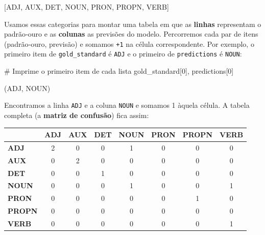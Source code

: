 \documentclass[
  brazilian,
  11pt,
]{article}
\newenvironment{Shaded}{\begin{snugshade}}{\end{snugshade}}
\newcommand{\CommentTok}[1]{\textcolor[rgb]{0.48,0.49,0.49}{#1}}
\newcommand{\DecValTok}[1]{\textcolor[rgb]{0.96,0.45,0.00}{#1}}
\newcommand{\NormalTok}[1]{\textcolor[rgb]{0.81,0.81,0.76}{#1}}
\newcounter{none} %
\let\oldtexttt\texttt
\renewcommand{\texttt}[1]{{\color{inlink}\oldtexttt{#1}}}
\begin{document}
\begin{Shaded}
\begin{Highlighting}[]
\NormalTok{[\textquotesingle{}ADJ\textquotesingle{}, \textquotesingle{}AUX\textquotesingle{}, \textquotesingle{}DET\textquotesingle{}, \textquotesingle{}NOUN\textquotesingle{}, \textquotesingle{}PRON\textquotesingle{}, \textquotesingle{}PROPN\textquotesingle{}, \textquotesingle{}VERB\textquotesingle{}]}
\end{Highlighting}
\end{Shaded}

Usamos essas categorias para montar uma tabela em que as \textbf{linhas}
representam o padrão‑ouro e as \textbf{colunas} as previsões do modelo.
Percorremos cada par de itens (padrão‑ouro, previsão) e somamos
\texttt{+1} na célula correspondente. Por exemplo, o primeiro item de
\texttt{gold\_standard} é \texttt{ADJ} e o primeiro de
\texttt{predictions} é \texttt{NOUN}:

\begin{Shaded}
\begin{Highlighting}[]
\CommentTok{\# Imprime o primeiro item de cada lista}
\NormalTok{gold\_standard[}\DecValTok{0}\NormalTok{], predictions[}\DecValTok{0}\NormalTok{]}
\end{Highlighting}
\end{Shaded}

\begin{Shaded}
\begin{Highlighting}[]
\NormalTok{(\textquotesingle{}ADJ\textquotesingle{}, \textquotesingle{}NOUN\textquotesingle{})}
\end{Highlighting}
\end{Shaded}

Encontramos a linha \texttt{ADJ} e a coluna \texttt{NOUN} e somamos 1
àquela célula. A tabela completa (a \textbf{matriz de confusão}) fica
assim:

{\def\LTcaptype{none} %
\begin{longtable}[]{@{}lccccccc@{}}
\toprule\noalign{}
& ADJ & AUX & DET & NOUN & PRON & PROPN & VERB \\
\midrule\noalign{}
\endhead
\bottomrule\noalign{}
\endlastfoot
\textbf{ADJ} & 2 & 0 & 0 & 1 & 0 & 0 & 0 \\
\textbf{AUX} & 0 & 2 & 0 & 0 & 0 & 0 & 0 \\
\textbf{DET} & 0 & 0 & 1 & 0 & 0 & 0 & 0 \\
\textbf{NOUN} & 0 & 0 & 0 & 1 & 0 & 0 & 1 \\
\textbf{PRON} & 0 & 0 & 0 & 0 & 0 & 1 & 0 \\
\textbf{PROPN} & 0 & 0 & 0 & 0 & 0 & 0 & 0 \\
\textbf{VERB} & 0 & 0 & 0 & 0 & 0 & 0 & 1 \\
\end{longtable}
}
\end{document}
